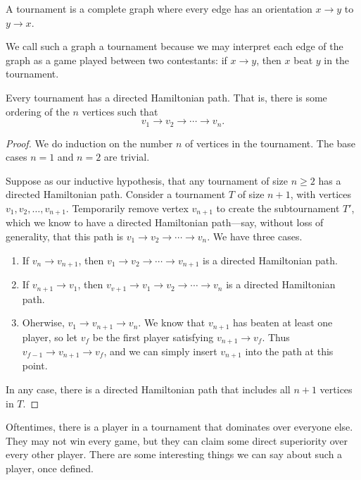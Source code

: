 \documentclass[../m055main.tex]{subfiles}
\begin{document}
\begin{definition}[Tournament]
    A tournament is a complete graph where every edge has an orientation $x \to y$ to $y \to x$.
\end{definition}

We call such a graph a tournament because we may interpret each edge of the graph as a game played between two contestants: if $x \to y$, then $x$ beat $y$ in the tournament.

\begin{theorem}[]
    Every tournament has a directed Hamiltonian path.
    That is, there is some ordering of the $n$ vertices such that
    \[ v_1 \to v_2 \to \cdots \to v_n. \]
\end{theorem}

\begin{proof}
    We do induction on the number $n$ of vertices in the tournament.
    The base cases $n=1$ and $n=2$ are trivial.

    Suppose as our inductive hypothesis, that any tournament of size $n \geq 2$ has a directed Hamiltonian path.
    Consider a tournament $T$ of size $n+1$, with vertices $v_1, v_2, \ldots, v_{n+1}$.
    Temporarily remove vertex $v_{n+1}$ to create the subtournament $T'$, which we know to have a directed Hamiltonian path---say, without loss of generality, that this path is $v_1 \to v_2 \to \cdots \to v_n$.
    We have three cases.
    \begin{enumerate}[label=(\alph*)]
        \item If $v_n \to v_{n+1}$, then $v_1 \to v_2 \to \cdots \to v_{n+1}$ is a directed Hamiltonian path.
        \item If $v_{n+1} \to v_1$, then $v_{v+1} \to v_1 \to v_2 \to \cdots \to v_n$ is a directed Hamiltonian path.
        \item Oherwise, $v_1 \to v_{n+1} \to v_n$.
        We know that $v_{n+1}$ has beaten at least one player, so let $v_f$ be the first player satisfying $v_{n+1} \to v_f$.
        Thus $v_{f-1} \to v_{n+1} \to v_f$, and we can simply insert $v_{n+1}$ into the path at this point.
    \end{enumerate}
    In any case, there is a directed Hamiltonian path that includes all $n+1$ vertices in $T$.
\end{proof}

Oftentimes, there is a player in a tournament that dominates over everyone else.
They may not win every game, but they can claim some direct superiority over every other player.
There are some interesting things we can say about such a player, once defined.
\end{document}
